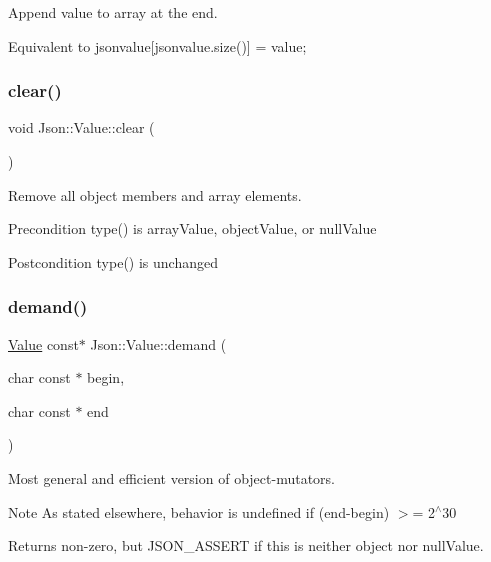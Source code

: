 Append value to array at the end. 

Equivalent to jsonvalue\mbox{[}jsonvalue.\+size()\mbox{]} = value; \mbox{\label{classJson_1_1Value_a501a4d67e6c875255c2ecc03ccd2019b}} 
\subsubsection{\texorpdfstring{clear()}{clear()}}
{\footnotesize\ttfamily void Json\+::\+Value\+::clear (\begin{DoxyParamCaption}{ }\end{DoxyParamCaption})}

Remove all object members and array elements. \begin{DoxyPrecond}{Precondition}
type() is array\+Value, object\+Value, or null\+Value 
\end{DoxyPrecond}
\begin{DoxyPostcond}{Postcondition}
type() is unchanged 
\end{DoxyPostcond}
\mbox{\label{classJson_1_1Value_afeb7ff596a0929d90c5f2f3cffb413ed}} 
\subsubsection{\texorpdfstring{demand()}{demand()}}
{\footnotesize\ttfamily \hyperlink{classJson_1_1Value}{Value} const$\ast$ Json\+::\+Value\+::demand (\begin{DoxyParamCaption}\item[{char const $\ast$}]{begin,  }\item[{char const $\ast$}]{end }\end{DoxyParamCaption})}

Most general and efficient version of object-\/mutators. \begin{DoxyNote}{Note}
As stated elsewhere, behavior is undefined if (end-\/begin) $>$= 2$^\wedge$30 
\end{DoxyNote}
\begin{DoxyReturn}{Returns}
non-\/zero, but J\+S\+O\+N\+\_\+\+A\+S\+S\+E\+RT if this is neither object nor null\+Value. 
\end{DoxyReturn}
\mbox{\label{classJson_1_1Value_afb007b9ce9b2cf9d5f667a07e5e0349f}} 
